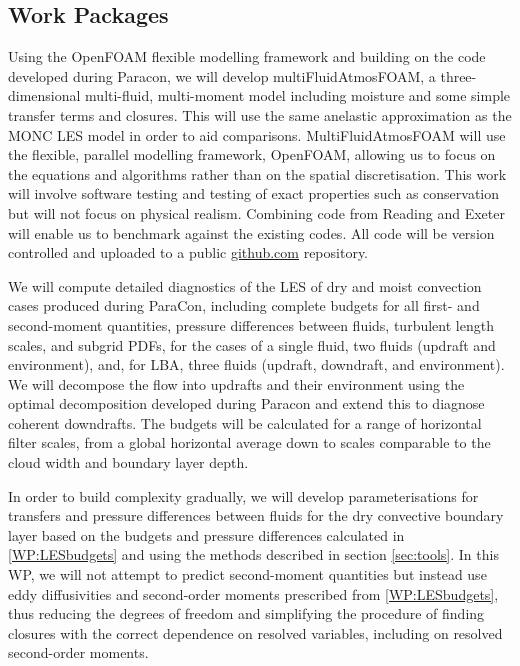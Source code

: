 \documentclass[11pt,a4paper]{article}
\begin{document}
\subsection{Work Packages}
\label{sec:WPs}


Using the OpenFOAM flexible modelling framework and building on the code developed during Paracon, we will develop multiFluidAtmosFOAM, a three-dimensional multi-fluid, multi-moment model including moisture and some simple transfer terms and closures. This will use the same anelastic approximation as the MONC LES model in order to aid comparisons. MultiFluidAtmosFOAM will use the flexible, parallel modelling framework, OpenFOAM, allowing us to focus on the equations and algorithms rather than on the spatial discretisation. This work will involve software testing and testing of exact properties such as conservation but will not focus on physical realism. Combining code from Reading and Exeter will enable us to benchmark against the existing codes. All code will be version controlled and uploaded to a public \url{github.com} repository. 


We will compute detailed diagnostics of the LES of dry and moist convection cases produced during ParaCon, including complete budgets for all first- and second-moment quantities, pressure differences between fluids, turbulent length scales, and subgrid PDFs, for the cases of a single fluid, two fluids (updraft and environment), and, for LBA, three fluids (updraft, downdraft, and environment).
We will decompose the flow into updrafts and their environment using the optimal decomposition developed during Paracon and extend this to diagnose coherent downdrafts. The budgets will be calculated for a range of horizontal filter scales, from a global horizontal average down to scales comparable to the cloud width and boundary layer depth.



In order to build complexity gradually, we will develop parameterisations for transfers and pressure differences between fluids for the dry convective boundary layer based on the budgets and pressure differences calculated in \ref{WP:LESbudgets} and using the methods described in section \ref{sec:tools}. In this WP, we will not attempt to predict second-moment quantities but instead use eddy diffusivities and second-order moments prescribed from \ref{WP:LESbudgets}, thus reducing the degrees of freedom and simplifying the procedure of finding closures with the correct dependence on resolved variables, including on resolved second-order moments. 
\end{document}
